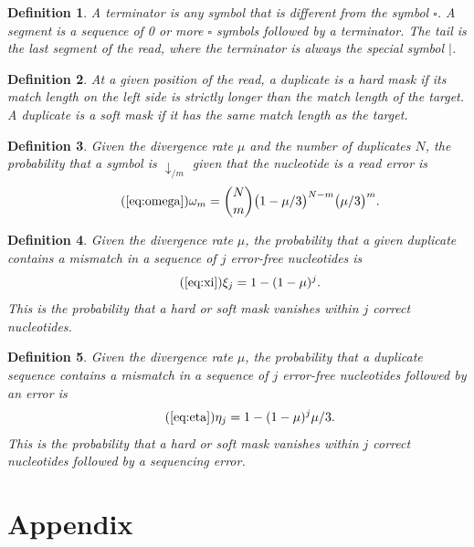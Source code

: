 \documentclass{article}
\newtheorem{definition}{Definition}
\begin{document}
\begin{definition}
\label{def:seg}
A terminator is any symbol that is different from the symbol $\square$. A
segment is a sequence of 0 or more $\square$ symbols followed by a
terminator. The tail is the last segment of the read, where the terminator
is always the special symbol $|$.
\end{definition}

\begin{definition}
At a given position of the read, a duplicate is a \emph{hard mask} if its
match length on the left side is strictly longer than the match length
of the target. A duplicate is a \emph{soft mask} if it has the same match
length as the target.
\end{definition}

\begin{definition}
Given the divergence rate $\mu$ and the number of duplicates $N$, the
probability that a symbol is $\downarrow_{/m}$ given that the nucleotide
is a read error is
\begin{equation}
\tag{\ref{eq:omega}}
\omega_m = {N \choose m} \big(1 - \mu/3\big)^{N-m} \big(\mu/3\big)^m.
\end{equation}
\end{definition}

\begin{definition}
Given the divergence rate $\mu$, the probability that a given duplicate
contains a mismatch in a sequence of $j$ error-free nucleotides is
\begin{equation}
\tag{\ref{eq:xi}}
\xi_j = 1-(1-\mu)^j.
\end{equation}
This is the probability that a hard or soft mask vanishes within $j$
correct nucleotides.
\end{definition}

\begin{definition}
Given the divergence rate $\mu$, the probability that a duplicate sequence
contains a mismatch in a sequence of $j$ error-free nucleotides followed
by an error is
\begin{equation}
\tag{\ref{eq:eta}}
\eta_j = 1-(1-\mu)^j\mu/3.
\end{equation}
This is the probability that a hard or soft mask vanishes within $j$
correct nucleotides followed by a sequencing error.
\end{definition}

\section{Appendix}
\label{app_extra}
\end{document}
